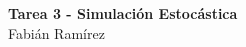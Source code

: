 \begin{center}
    \huge{
    \textbf{
        Tarea 3 - Simulación Estocástica 
    }
    }\\
    \normalsize{
Fabián Ramírez
    }
\end{center}
